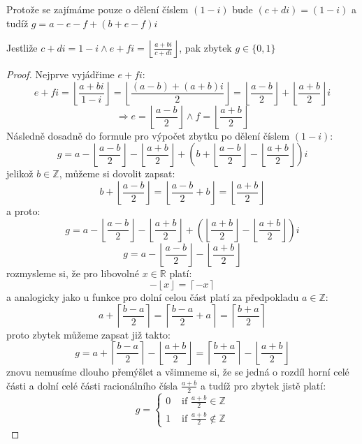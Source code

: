 \documentclass[czech,bachelor,dept470,male]{diploma}
\begin{document}
\begin{remark}
	Protože se zajímáme pouze o dělení číslem $(1-i)$ bude $(c+di) = (1-i)$ a tudíž $g=a - e-f + (b + e -f)i$
	\end{remark}
\begin{theorem}
	Jestliže $c+di = 1-i \land e+fi = \left\lfloor\frac{a+bi}{c+di}\right\rfloor$, pak zbytek $g \in \{0,1\}$
	\end{theorem}
\begin{proof}
	Nejprve vyjádřime $e+fi$:
	$$e+fi = \left\lfloor\frac{a+bi}{1-i}\right\rfloor =  \left\lfloor\frac{(a-b)+(a+b)i}{2}\right\rfloor =  \left\lfloor\frac{a-b}{2}\right\rfloor + \left\lfloor\frac{a+b}{2}\right\rfloor i$$
	$$ \Rightarrow e =  \left\lfloor\frac{a-b}{2}\right\rfloor \land f =  \left\lfloor\frac{a+b}{2}\right\rfloor$$
	Následně dosadně do formule pro výpočet zbytku po dělení číslem $(1-i)$:
	$$g = a - \left\lfloor\frac{a-b}{2}\right\rfloor - \left\lfloor\frac{a+b}{2}\right\rfloor + \left(b+\left\lfloor\frac{a-b}{2}\right\rfloor - \left\lfloor\frac{a+b}{2}\right\rfloor\right)i$$
	jelikož $b\in\mathbb{Z}$, můžeme si dovolit zapsat:
	$$b+\left\lfloor\frac{a-b}{2}\right\rfloor = \left\lfloor\frac{a-b}{2} +b\right\rfloor = \left\lfloor\frac{a+b}{2}\right\rfloor$$
	a proto: $$g = a - \left\lfloor\frac{a-b}{2}\right\rfloor - \left\lfloor\frac{a+b}{2}\right\rfloor+\left(\left\lfloor\frac{a+b}{2}\right\rfloor-\left\lfloor\frac{a+b}{2}\right\rfloor\right)i$$
	$$g = a - \left\lfloor\frac{a-b}{2}\right\rfloor - \left\lfloor\frac{a+b}{2}\right\rfloor$$
	rozmysleme si, že pro libovolné $x\in\mathbb{R}$ platí:
	$$ -\left\lfloor x\right\rfloor=\left\lceil-x\right\rceil$$
	a analogicky jako u funkce pro dolní celou část platí za předpokladu $a\in\mathbb{Z}$:
	$$a+\left\lceil\frac{b-a}{2}\right\rceil = \left\lceil\frac{b-a}{2} +a\right\rceil = \left\lceil\frac{b+a}{2}\right\rceil$$
	proto zbytek můžeme zapsat již takto:
	$$g = a + \left\lceil\frac{b-a}{2}\right\rceil - \left\lfloor\frac{a+b}{2}\right\rfloor = \left\lceil\frac{b+a}{2}\right\rceil- \left\lfloor\frac{a+b}{2}\right\rfloor$$
	znovu nemusíme dlouho přemýšlet a všimneme si, že se jedná o rozdíl horní celé části a dolní celé části racionálního čísla $\frac{a+b}{2}$ a tudíž pro zbytek jistě platí:
	$$g=\begin{cases}
	0&\mbox{ if } \frac{a+b}{2}\in \mathbb{Z}\\
	1&\mbox{ if } \frac{a+b}{2}\not\in \mathbb{Z}
	\end{cases}$$
		\end{proof}
\end{document}
